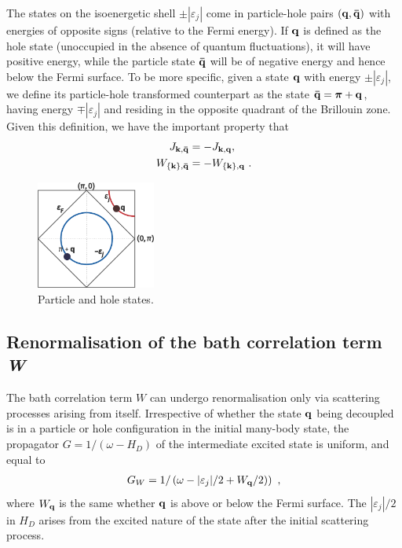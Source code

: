 \documentclass[reprint,hidelinks]{revtex4-2}
\begin{document}
\begin{widetext}
The states on the isoenergetic shell \(\pm|\varepsilon_j|\) come in particle-hole pairs \(\left( {\bf q}, {\bf \bar q} \right) \) with energies of opposite signs (relative to the Fermi energy). If \({\bf q}\) is defined as the hole state (unoccupied in the absence of quantum fluctuations), it will have positive energy, while the particle state \({\bf \bar q}\) will be of negative energy and hence below the Fermi surface. To be more specific, given a state \({\bf q}\) with energy \(\pm|\varepsilon_j|\), we define its particle-hole transformed counterpart as the state \({\bf \bar q} = \boldsymbol{\pi} + {\bf q}\), having energy \(\mp|\varepsilon_j|\) and residing in the opposite quadrant of the Brillouin zone. Given this definition, we have the important property that
\begin{equation}\begin{aligned}\label{particleHoleRelation}
	J_{{\bf k}, {\bf \bar q}} &= -J_{{\bf k}, {\bf q}},\\
	W_{\left\{{\bf k}\right\}, {\bf \bar q}} &= -W_{\left\{{\bf k}\right\}, {\bf q}}~.
\end{aligned}\end{equation}

\begin{figure}[htpb]
	\centering
	\includegraphics[width=0.35\textwidth]{particleHoleRelation.pdf}
	\caption{Particle and hole states.}
	\label{fig:particleHoleRelation-pdf}
\end{figure}
\subsection{Renormalisation of the bath correlation term {\it W}}
The bath correlation term \(W\) can undergo renormalisation only via scattering processes arising from itself. Irrespective of whether the state \({\bf q}\) being decoupled is in a particle or hole configuration in the initial many-body state, the propagator \(G = 1/(\omega - H_D)\) of the intermediate excited state is uniform, and equal to 
\begin{equation}\begin{aligned}\label{propagatorW}
	G_W = 1/\left(\omega - |\varepsilon_j|/2 + W_{\bf q}/2)\right)~,
\end{aligned}\end{equation}
where \(W_{\bf q}\) is the same whether \({\bf q}\) is above or below the Fermi surface. The \(|\varepsilon_j|/2\) in \(H_D\) arises from the excited nature of the state after the initial scattering process.


\end{widetext}
\end{document}
